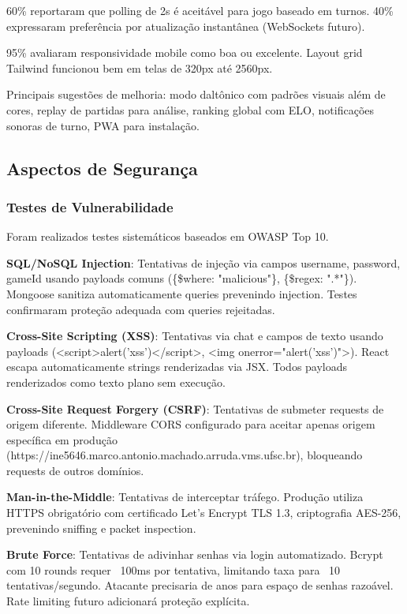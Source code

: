 \documentclass[conference]{IEEEtran}
\begin{document}
60\% reportaram que polling de 2s é aceitável para jogo baseado em turnos. 40\% expressaram preferência por atualização instantânea (WebSockets futuro).

95\% avaliaram responsividade mobile como boa ou excelente. Layout grid Tailwind funcionou bem em telas de 320px até 2560px.

Principais sugestões de melhoria: modo daltônico com padrões visuais além de cores, replay de partidas para análise, ranking global com ELO, notificações sonoras de turno, PWA para instalação.

\subsection{Aspectos de Segurança}

\subsubsection{Testes de Vulnerabilidade}

Foram realizados testes sistemáticos baseados em OWASP Top 10.

\textbf{SQL/NoSQL Injection}: Tentativas de injeção via campos username, password, gameId usando payloads comuns (\{\$where: "malicious"\}, \{\$regex: ".*"\}). Mongoose \cite{mongodb:2024} sanitiza automaticamente queries prevenindo injection. Testes confirmaram proteção adequada com queries rejeitadas.

\textbf{Cross-Site Scripting (XSS)}: Tentativas via chat e campos de texto usando payloads (<script>alert('xss')</script>, <img onerror="alert('xss')">). React \cite{react:2024} escapa automaticamente strings renderizadas via JSX. Todos payloads renderizados como texto plano sem execução.

\textbf{Cross-Site Request Forgery (CSRF)}: Tentativas de submeter requests de origem diferente. Middleware CORS configurado para aceitar apenas origem específica em produção (https://ine5646.marco.antonio.machado.arruda.vms.ufsc.br), bloqueando requests de outros domínios.

\textbf{Man-in-the-Middle}: Tentativas de interceptar tráfego. Produção utiliza HTTPS obrigatório com certificado Let's Encrypt TLS 1.3, criptografia AES-256, prevenindo sniffing e packet inspection.

\textbf{Brute Force}: Tentativas de adivinhar senhas via login automatizado. Bcrypt \cite{bcrypt:2024} com 10 rounds requer ~100ms por tentativa, limitando taxa para ~10 tentativas/segundo. Atacante precisaria de anos para espaço de senhas razoável. Rate limiting futuro adicionará proteção explícita.
\end{document}
